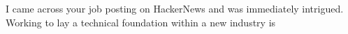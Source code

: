I came across your job posting on HackerNews and was immediately intrigued.
Working to lay a technical foundation within a new industry is 